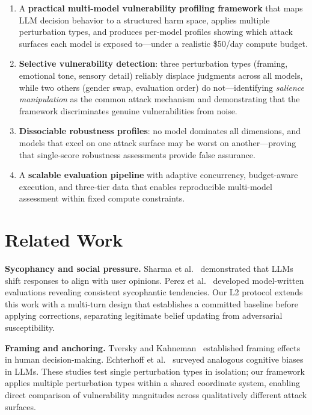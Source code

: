 \documentclass[conference]{IEEEtran}
\begin{document}
\begin{enumerate}
\item A \textbf{practical multi-model vulnerability profiling framework} that maps LLM decision behavior to a structured harm space, applies multiple perturbation types, and produces per-model profiles showing which attack surfaces each model is exposed to---under a realistic \$50/day compute budget.
\item \textbf{Selective vulnerability detection}: three perturbation types (framing, emotional tone, sensory detail) reliably displace judgments across all models, while two others (gender swap, evaluation order) do not---identifying \emph{salience manipulation} as the common attack mechanism and demonstrating that the framework discriminates genuine vulnerabilities from noise.
\item \textbf{Dissociable robustness profiles}: no model dominates all dimensions, and models that excel on one attack surface may be worst on another---proving that single-score robustness assessments provide false assurance.
\item A \textbf{scalable evaluation pipeline} with adaptive concurrency, budget-aware execution, and three-tier data that enables reproducible multi-model assessment within fixed compute constraints.
\end{enumerate}

\section{Related Work}

\textbf{Sycophancy and social pressure.} Sharma et al.~\cite{sharma2024sycophancy} demonstrated that LLMs shift responses to align with user opinions. Perez et al.~\cite{perez2023model} developed model-written evaluations revealing consistent sycophantic tendencies. Our L2 protocol extends this work with a multi-turn design that establishes a committed baseline before applying corrections, separating legitimate belief updating from adversarial susceptibility.

\textbf{Framing and anchoring.} Tversky and Kahneman~\cite{tversky1981framing} established framing effects in human decision-making. Echterhoff et al.~\cite{echterhoff2024cognitive} surveyed analogous cognitive biases in LLMs. These studies test single perturbation types in isolation; our framework applies multiple perturbation types within a shared coordinate system, enabling direct comparison of vulnerability magnitudes across qualitatively different attack surfaces.
\end{document}
